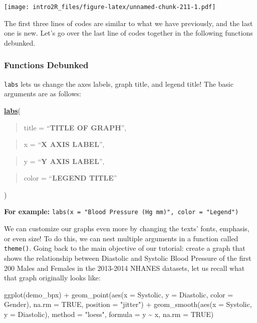 \documentclass[
]{book}
\newenvironment{Shaded}{\begin{snugshade}}{\end{snugshade}}
\newcommand{\AttributeTok}[1]{\textcolor[rgb]{0.77,0.63,0.00}{#1}}
\newcommand{\ConstantTok}[1]{\textcolor[rgb]{0.00,0.00,0.00}{#1}}
\newcommand{\FunctionTok}[1]{\textcolor[rgb]{0.00,0.00,0.00}{#1}}
\newcommand{\NormalTok}[1]{#1}
\newcommand{\SpecialCharTok}[1]{\textcolor[rgb]{0.00,0.00,0.00}{#1}}
\newcommand{\StringTok}[1]{\textcolor[rgb]{0.31,0.60,0.02}{#1}}
\begin{document}
\texttt{[image: intro2R\_files/figure-latex/unnamed-chunk-211-1.pdf]}

The first three lines of codes are similar to what we have previously, and the last one is new. Let's go over the last line of codes together in the following functions debunked.

\hypertarget{functions-debunked-20}{%
\subsubsection{Functions Debunked}\label{functions-debunked-20}}

\texttt{labs} lets us change the axes labels, graph title, and legend title! The basic arguments are as follows:

\textbf{\href{https://ggplot2.tidyverse.org/reference/labs.html}{labs}}(

\begin{quote}
title = ``\textbf{TITLE OF GRAPH}'',
\end{quote}

\begin{quote}
x = ``\textbf{X AXIS LABEL}'',
\end{quote}

\begin{quote}
y = ``\textbf{Y AXIS LABEL}'',
\end{quote}

\begin{quote}
color = ``\textbf{LEGEND TITLE}''
\end{quote}

)

\textbf{For example:} \texttt{labs(x\ =\ "Blood\ Pressure\ (Hg\ mm)",\ color\ =\ "Legend")}

We can customize our graphs even more by changing the texts' fonts, emphasis, or even size! To do this, we can nest multiple arguments in a function called \texttt{theme()}. Going back to the main objective of our tutorial: create a graph that shows the relationship between Diastolic and Systolic Blood Pressure of the first 200 Males and Females in the 2013-2014 NHANES datasets, let us recall what that graph originally looks like:

\begin{Shaded}
\begin{Highlighting}[]
\FunctionTok{ggplot}\NormalTok{(demo\_bpx) }\SpecialCharTok{+}
    \FunctionTok{geom\_point}\NormalTok{(}\FunctionTok{aes}\NormalTok{(}\AttributeTok{x =}\NormalTok{ Systolic, }\AttributeTok{y =}\NormalTok{ Diastolic, }\AttributeTok{color =}\NormalTok{ Gender), }
             \AttributeTok{na.rm =} \ConstantTok{TRUE}\NormalTok{,}
             \AttributeTok{position =} \StringTok{"jitter"}\NormalTok{) }\SpecialCharTok{+}
    \FunctionTok{geom\_smooth}\NormalTok{(}\FunctionTok{aes}\NormalTok{(}\AttributeTok{x =}\NormalTok{ Systolic, }\AttributeTok{y =}\NormalTok{ Diastolic),}
                \AttributeTok{method =} \StringTok{"loess"}\NormalTok{,}
                \AttributeTok{formula =}\NormalTok{ y }\SpecialCharTok{\textasciitilde{}}\NormalTok{ x,}
                \AttributeTok{na.rm =} \ConstantTok{TRUE}\NormalTok{)}
\end{Highlighting}
\end{Shaded}
\end{document}
